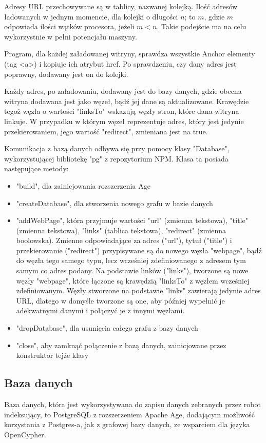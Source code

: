 \documentclass[a4paper, 12pt]{article}
\begin{document}
Adresy URL przechowywane są w tablicy, nazwanej kolejką. Ilość adresów ładowanych w jednym momencie, dla kolejki o długości \(n\); to \(m\), gdzie \(m\) odpowiada ilości wątków procesora, jeżeli \(m < n\). Takie podejście ma na celu wykorzystnie w pełni potencjału maszyny.

Program, dla każdej załadowanej witryny, sprawdza wszystkie Anchor elementy (tag <a>) i kopiuje ich atrybut href. Po sprawdzeniu, czy dany adres jest poprawny, dodawany jest on do kolejki.

Każdy adres, po załadowaniu, dodawany jest do bazy danych, gdzie obecna witryna dodawana jest jako węzeł, bądź jej dane są aktualizowane. Krawędzie tegoż węzła o wartości "linksTo" wskazują węzły stron, które dana witryna linkuje. W przypadku w którym węzeł reprezentuje adres, który jest jedynie przekierowaniem, jego wartość "redirect", zmieniana jest na true.

Komunikacja z bazą danych odbywa się przy pomocy klasy "Database", wykorzystującej bibliotekę "pg" z repozytorium NPM. Klasa ta posiada następujące metody:
\begin{itemize}
	\item "build", dla zainicjowania rozszerzenia Age
	\item "createDatabase", dla stworzenia nowego grafu w bazie danych
	\item "addWebPage", która przyjmuje wartości "url" (zmienna tekstowa), "title" (zmienna tekstowa), "links" (tablica tekstowa), "redirect" (zmienna boolowska). Zmienne odpowiadające za adres ("url"), tytuł ("title") i przekierowanie ("redirect") przypisywane są do nowego węzła "webpage", bądź do węzła tego samego typu, lecz wcześniej zdefiniowanego z adresem tym samym co adres podany. Na podstawie linków ("links"), tworzone są nowe węzły "webpage", które łączone są krawędzią "linksTo" z węzłem wcześniej zdefiniowanym. Węzły stworzone na podstawie "links" zawierają jedynie adres URL, dlatego w domyśle tworzone są one, aby później wypełnić je adekwatnymi danymi i połączyć je z innymi węzłami.
	\item "dropDatabase", dla usunięcia całego grafu z bazy danych
	\item "close", aby zamknąć połączenie z bazą danych, zainicjowane przez konstruktor tejże klasy
\end{itemize}

\subsection{Baza danych}
Baza danych, która jest wykorzystywana do zapisu danych zebranych przez robot indeksujący, to PostgreSQL z rozszerzeniem Apache Age, dodającym możliwość korzystania z Postgres-a, jak z grafowej bazy danych, ze wsparciem dla języka OpenCypher.
\end{document}
